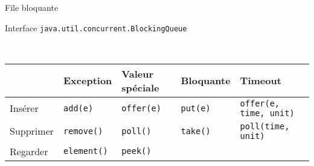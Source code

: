 \begin{frame}{File bloquante}

\vfill
  \begin{exampleblock}{Interface \lstinline{java.util.concurrent.BlockingQueue}}~

\vfill

~\hspace{-5mm}\begin{tabular}{|l|l|l|l|l|}
      \hline
      & Exception & Valeur spéciale & Bloquante & Timeout\\
      \hline
      Insérer & \lstinline+add(e)+ & \lstinline+offer(e)+ & \lstinline+put(e)+ & \lstinline+offer(e, time, unit)+  \\
      \hline
      Supprimer & \lstinline+remove()+ & \lstinline+poll()+ & \lstinline+take()+ & \lstinline+poll(time, unit)+ \\
      \hline
      Regarder & \lstinline+element()+ & \lstinline+peek()+ &  &  \\
      \hline
    \end{tabular}
  \end{exampleblock}

\vfill
\end{frame}

